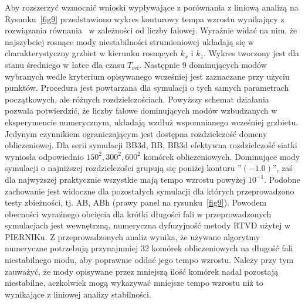 \par Aby rozszerzyć wzmocnić wnioski wypływające z porównania z liniową analizą
na Rysunku~\ref{fig9} przedstawiono wykres konturowy tempa wzrostu wynikający z
rozwiązania równania~ w zależności od liczby falowej. Wyraźnie
widać na nim, że najszybciej rosnące mody niestabilności strumieniowej układają
się w charakterystyczny grzbiet w kierunku rosnących $k_x$ i $k_z$. Wykres
tworzony jest dla stanu średniego w łatce dla czasu $T_{\textrm{ref}}$.
Następnie 9 dominujących modów wybranych wedle kryterium opisywanego wcześniej
jest zaznaczane przy użyciu punktów. Procedura jest powtarzana dla symulacji o
tych samych parametrach początkowych, ale różnych rozdzielczościach.
Powyższy schemat działania pozwala potwierdzić, że liczby falowe dominujących modów
wzbudzanych w eksperymencie numerycznym, układają wzdłuż wspomnianego wcześniej
grzbietu. Jedynym czynnikiem ograniczającym jest dostępna rozdzielczość domeny
obliczeniowej. Dla serii symulacji BB3d, BB, BB3d efektywna rozdzielczość siatki
wyniosła odpowiednio $150^2, 300^2, 600^2$ komórek obliczeniowych. Dominujące
mody symulacji o najniższej rozdzielczości grupują się poniżej konturu
''$(-1.0)$'', zaś dla najwyższej praktycznie wszystkie mają tempo wzrostu
powyżej $10^{-1}$. Podobne zachowanie jest widoczne dla pozostałych symulacji
dla których przeprowadzono testy zbieżności, tj. AB, ABh (prawy panel na
rysunku~\ref{fig9}). Powodem obecności wyraźnego obcięcia dla krótki długości
fali w przeprowadzonych symulacjach jest wewnętrzną, numeryczna dyfuzyjność metody
RTVD użytej w PIERNIKu. Z przeprowadzonych analiz wynika, że używane algorytmy
numeryczne potrzebują przynajmniej 32 komórek obliczeniowych na długość fali
niestabilnego modu, aby poprawnie oddać jego tempo wzrostu. Należy przy tym
zauważyć, że mody opisywane przez mniejszą ilość komórek nadal pozostają
niestabilne, aczkolwiek mogą wykazywać mniejsze tempo wzrostu niż to wynikające
z liniowej analizy stabilności.

